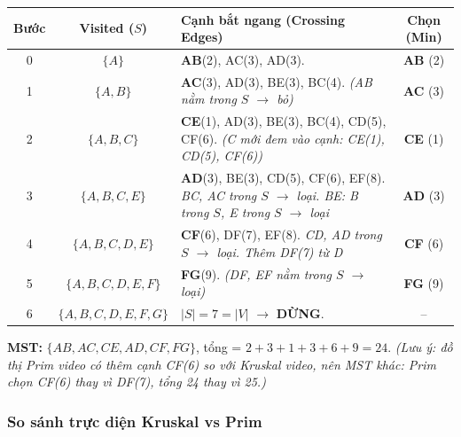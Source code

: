 \documentclass[10pt]{article}
\begin{document}
\begin{center}
\renewcommand{\arraystretch}{1.5}
\begin{tabular}{|c|c|p{6.5cm}|c|}
\hline
\textbf{Bước} & \textbf{Visited ($S$)} & \textbf{Cạnh bắt ngang (Crossing Edges)} & \textbf{Chọn (Min)} \\
\hline
0 & $\{A\}$ & \textbf{AB}(2), AC(3), AD(3). & \cellcolor{green!15} \textbf{AB} (2) \\
\hline
1 & $\{A,B\}$ & \textbf{AC}(3), AD(3), BE(3), BC(4). \newline \textit{(AB nằm trong $S$ $\to$ bỏ)} & \cellcolor{green!15} \textbf{AC} (3) \\
\hline
2 & $\{A,B,C\}$ & \textbf{CE}(1), AD(3), BE(3), BC(4), CD(5), CF(6). \newline \textit{(C mới đem vào cạnh: CE(1), CD(5), CF(6))} & \cellcolor{green!15} \textbf{CE} (1) \\
\hline
3 & $\{A,B,C,E\}$ & \textbf{AD}(3), BE(3), CD(5), CF(6), EF(8). \newline \textcolor{red!80!black}{\textit{BC, AC trong $S$ $\to$ loại. BE: B trong $S$, E trong $S$ $\to$ loại}} & \cellcolor{green!15} \textbf{AD} (3) \\
\hline
4 & $\{A,B,C,D,E\}$ & \textbf{CF}(6), DF(7), EF(8). \newline \textcolor{red!80!black}{\textit{CD, AD trong $S$ $\to$ loại. Thêm DF(7) từ D}} & \cellcolor{green!15} \textbf{CF} (6) \\
\hline
5 & $\{A,B,C,D,E,F\}$ & \textbf{FG}(9). \newline \textit{(DF, EF nằm trong $S$ $\to$ loại)} & \cellcolor{green!15} \textbf{FG} (9) \\
\hline
6 & $\{A,B,C,D,E,F,G\}$ & $|S|=7=|V|$ $\to$ \textbf{DỪNG}. & -- \\
\hline
\end{tabular}
\label{tab:prim-trace}
\end{center}
\vspace{0.3cm}

\textbf{MST:} $\{AB, AC, CE, AD, CF, FG\}$, tổng = $2+3+1+3+6+9 = \boxed{24}$. \textit{(Lưu ý: đồ thị Prim video có thêm cạnh CF(6) so với Kruskal video, nên MST khác: Prim chọn CF(6) thay vì DF(7), tổng 24 thay vì 25.)}

\subsubsection{So sánh trực diện Kruskal vs Prim}\label{so-sanh-kruskal-prim}
\end{document}
